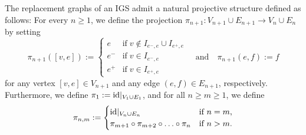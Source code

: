 \documentclass{amsart}
\newcommand{\id}{{\rm id}}
\numberwithin{equation}{section}
\theoremstyle{definition}
\theoremstyle{remark}
\begin{document}
 

The replacement graphs of an IGS admit a natural projective structure defined as follows: For every \(n\geq 1\), we define the projection \(\pi_{n+1}\colon V_{n+1}\cup E_{n+1}\to V_n\cup E_n\) by setting
    \[
        \pi_{n+1}([v,e]):=
        \begin{cases}
            e&\text{if}\;v\not\in I_{e^-,e}\cup I_{e^+,e}\\
            e^-&\text{if}\;v\in I_{e^-,e}\\
            e^+&\text{if}\;v\in I_{e^+,e}
        \end{cases}
        \quad\text{and}\quad \pi_{n+1}(e,f):=f
    \]
for any vertex \([v,e]\in V_{n+1}\) and any edge \((e,f)\in E_{n+1}\), respectively. Furthermore, we define \(\pi_1:= \id\vert_{V_1\cup E_1}\), and for all \(n\geq m \geq 1\), we define
    \[
        \pi_{n,m}:=\begin{cases}
            \id\vert_{V_n\cup E_n}&\text{if } n=m,\\
            \pi_{m+1}\circ\pi_{m+2}\circ\ldots\circ\pi_n&\text{if } n>m.
        \end{cases}
    \]
    
    
\end{document}
